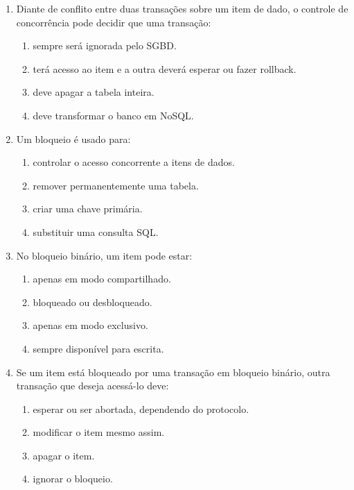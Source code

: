 \documentclass[12pt,a4paper]{article}
\begin{document}
\begin{enumerate}[label=\textbf{Q\arabic*.}]
\item Diante de conflito entre duas transações sobre um item de dado, o controle de concorrência pode decidir que uma transação:

\begin{enumerate}[label=\alph*)]
    \item sempre será ignorada pelo SGBD.
    \item terá acesso ao item e a outra deverá esperar ou fazer rollback.
    \item deve apagar a tabela inteira.
    \item deve transformar o banco em NoSQL.
\end{enumerate}

\item Um bloqueio é usado para:

\begin{enumerate}[label=\alph*)]
    \item controlar o acesso concorrente a itens de dados.
    \item remover permanentemente uma tabela.
    \item criar uma chave primária.
    \item substituir uma consulta SQL.
\end{enumerate}

\item No bloqueio binário, um item pode estar:

\begin{enumerate}[label=\alph*)]
    \item apenas em modo compartilhado.
    \item bloqueado ou desbloqueado.
    \item apenas em modo exclusivo.
    \item sempre disponível para escrita.
\end{enumerate}

\item Se um item está bloqueado por uma transação em bloqueio binário, outra transação que deseja acessá-lo deve:

\begin{enumerate}[label=\alph*)]
    \item esperar ou ser abortada, dependendo do protocolo.
    \item modificar o item mesmo assim.
    \item apagar o item.
    \item ignorar o bloqueio.
\end{enumerate}


\end{enumerate}
\end{document}
